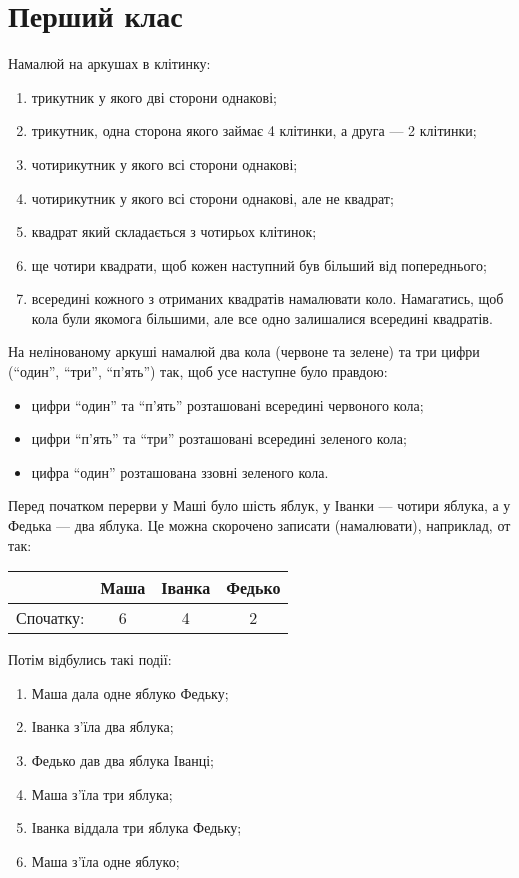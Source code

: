 \chapter{Перший клас}


\problem
Намалюй на аркушах в клітинку:
\begin{enumerate}
    \item трикутник у якого дві сторони однакові;
    \item трикутник, одна сторона якого займає 4 клітинки, а друга --- 2 клітинки;
    \item чотирикутник у якого всі сторони однакові;
    \item чотирикутник у якого всі сторони однакові, але не квадрат;
    \item квадрат який складається з чотирьох клітинок;
    \item ще чотири квадрати, щоб кожен наступний був більший від попереднього;
    \item всередині кожного з отриманих квадратів намалювати коло.
    Намагатись, щоб кола були якомога більшими,
    але все одно залишалися всередині квадратів.
\end{enumerate}


\problem
На нелінованому аркуші намалюй два кола (червоне та зелене)
та три цифри (“один”, “три”, “п'ять”) так,
щоб усе наступне було правдою:
\begin{itemize}
    \item цифри “один” та “п'ять” розташовані всередині червоного кола;
    \item цифри “п'ять” та “три” розташовані всередині зеленого кола;
    \item цифра “один” розташована ззовні зеленого кола.
\end{itemize}


\problem
Перед початком перерви у Маші було шість яблук,
у Іванки --- чотири яблука, а у Федька --- два яблука.
Це можна скорочено записати (намалювати), наприклад, от так:

\medskip

\begin{tabular}{|r|c|c|c|}
\hline
& Маша & Іванка & Федько \\
\hline
Спочатку: & 6 & 4 & 2 \\
\hline
\end{tabular}

\medskip

Потім відбулись такі події:
\begin{enumerate}
    \item Маша дала одне яблуко Федьку;
    \item Іванка з'їла два яблука;
    \item Федько дав два яблука Іванці;
    \item Маша з'їла три яблука;
    \item Іванка віддала три яблука Федьку;
    \item Маша з'їла одне яблуко;
\end{enumerate}

